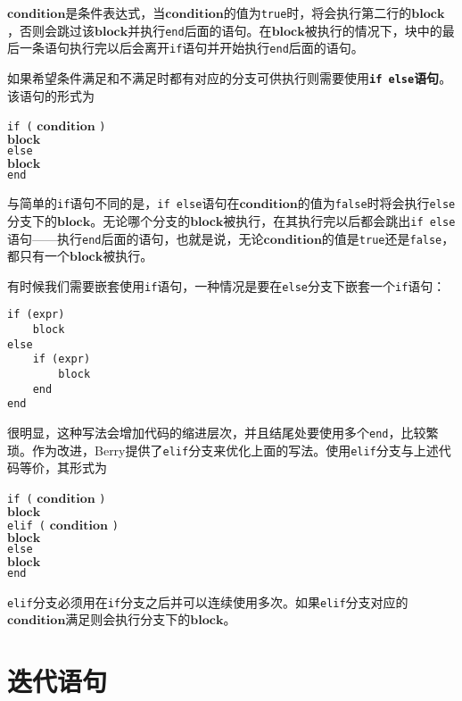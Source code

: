 $\bm{condition}$是条件表达式，当$\bm{condition}$的值为\texttt{true}时，将会执行第二行的$\bm{block}$，否则会跳过该$\bm{block}$并执行\texttt{end}后面的语句。在$\bm{block}$被执行的情况下，块中的最后一条语句执行完以后会离开\texttt{if}语句并开始执行\texttt{end}后面的语句。

如果希望条件满足和不满足时都有对应的分支可供执行则需要使用\textbf{\texttt{if else}语句}。该语句的形式为
\begin{algorithm}
    \texttt{if (} $\bm{condition}$ \texttt{)} \\
        \qquad $\bm{block}$ \\
    \texttt{else} \\
        \qquad $\bm{block}$ \\
    \texttt{end}
\end{algorithm}

与简单的\texttt{if}语句不同的是，\texttt{if else}语句在$\bm{condition}$的值为\texttt{false}时将会执行\texttt{else}分支下的$\bm{block}$。无论哪个分支的$\bm{block}$被执行，在其执行完以后都会跳出\texttt{if else}语句——执行\texttt{end}后面的语句，也就是说，无论$\bm{condition}$的值是\texttt{true}还是\texttt{false}，都只有一个$\bm{block}$被执行。

有时候我们需要嵌套使用\texttt{if}语句，一种情况是要在\texttt{else}分支下嵌套一个\texttt{if}语句：
\begin{lstlisting}[language=berry, numbers=none]
if (expr)
    block
else
    if (expr)
        block
    end
end
\end{lstlisting}
很明显，这种写法会增加代码的缩进层次，并且结尾处要使用多个\texttt{end}，比较繁琐。作为改进，Berry提供了\texttt{elif}分支来优化上面的写法。使用\texttt{elif}分支与上述代码等价，其形式为
\begin{algorithm}
    \texttt{if (} $\bm{condition}$ \texttt{)} \\
        \qquad $\bm{block}$ \\
    \texttt{elif (} $\bm{condition}$ \texttt{)} \\
        \qquad $\bm{block}$ \\
    \texttt{else} \\
    \qquad $\bm{block}$ \\
    \texttt{end}
\end{algorithm}

\texttt{elif}分支必须用在\texttt{if}分支之后并可以连续使用多次。如果\texttt{elif}分支对应的$\bm{condition}$满足则会执行分支下的$\bm{block}$。

\section{迭代语句}

